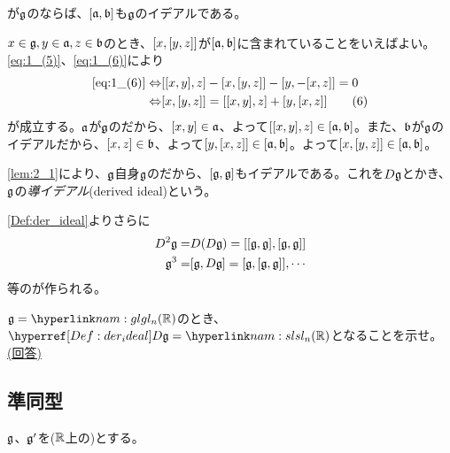 \documentclass[../main]{subfiles}
\begin{document}
\begin{lemma}\label{lem:2_1}
  が$\mathfrak{g}$の{}ならば、$\comm{\a}{\b}$も$\mathfrak{g}$のイデアルである。
\end{lemma}

\begin{Proof}
  $x\in\mathfrak{g},y\in\mathfrak{a},z\in\mathfrak{b}$のとき、$\comm{x}{\comm{y}{z}}$が$\comm{\a}{\b}$に含まれていることをいえばよい。\eqref{eq:1_(5)}、\eqref{eq:1_(6)}により
  \begin{align*}
    \mathrm{\eqref{eq:1_(6)}} 
    \Leftrightarrow
    & \comm{\comm{x}{y}}{z}-\comm{x}{\comm{y}{z}}-\comm{y}{-\comm{x}{z}}=0\\
    \Leftrightarrow
    & \comm{x}{\comm{y}{z}}=\comm{\comm{x}{y}}{z}+\comm{y}{\comm{x}{z}} \tag{6}\label{eq:2_(6)}
  \end{align*}
  が成立する。$\mathfrak{a}$が$\mathfrak{g}$の{}だから、$\comm{x}{y}\in\a$、よって$\comm{\comm{x}{y}}{z}\in\comm{\a}{\b}$。また、$\mathfrak{b}$が$\mathfrak{g}$のイデアルだから、$\comm{x}{z}\in\b$、よって$\comm{y}{\comm{x}{z}}\in\comm{\a}{\b}$。よって$\comm{x}{\comm{y}{z}}\in\comm{\a}{\b}$。
\end{Proof}

\begin{definition}[導イデアル]\label{Def:der_ideal}
  \cref{lem:2_1}により、$\mathfrak{g}$自身$\mathfrak{g}$の{}だから、$\comm{\g}{\g}$もイデアルである。これを$D\mathfrak{g}$とかき、$\mathfrak{g}$の\emph{導イデアル}(derived ideal)という。
\end{definition}
\begin{remark}
  \cref{Def:der_ideal}よりさらに
  \begin{align*}
    D^{2}\g =& D(D\g) = \comm{\comm{\g}{\g}}{\comm{\g}{\g}}\\
    \g^{3} =& \comm{\g}{D\g} = \comm{\g}{\comm{\g}{\g}},\cdots
  \end{align*}
  等の{}が作られる。
\end{remark}

\begin{problem}\label{prob:1}
  $\g=\hlin{nam:gl}{\gl_n(\R)}$のとき、$\href{Def:der_ideal}{D\g}=\hlin{nam:sl}{\sl_n(\R)}$となることを示せ。
  \href{sol:1}{(回答)}
\end{problem}

\subsection{準同型}
$\mathfrak{g}$、$\mathfrak{g}^\prime$を($\mathbb{R}$上の){}とする。
\end{document}
